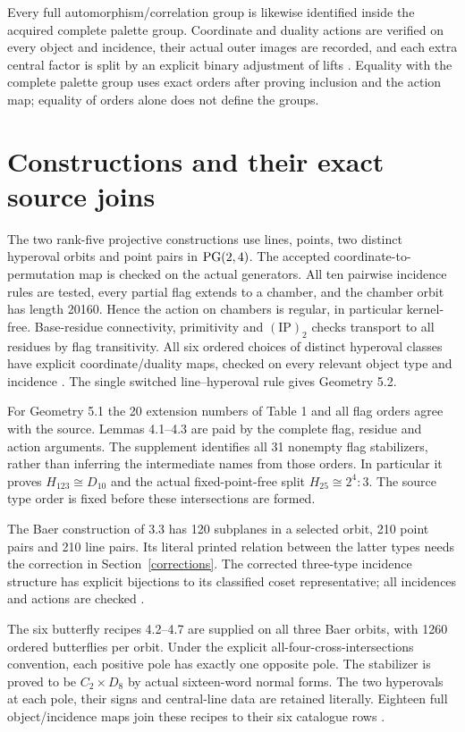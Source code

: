 \documentclass[11pt]{article}
\newcommand{\ip}{\mathrm{(IP)}_2}
\begin{document}
Every full automorphism/correlation group is likewise identified
inside the acquired complete palette group. Coordinate and duality
actions are verified on every object and incidence, their actual
outer images are recorded, and each extra central factor is split
by an explicit binary adjustment of lifts \cite{Groups}. Equality
with the complete palette group uses exact orders after proving
inclusion and the action map; equality of orders alone does not
define the groups.

\section{Constructions and their exact source joins}\label{construct}
The two rank-five projective constructions use lines, points, two
distinct hyperoval orbits and point pairs in $\operatorname{PG}(2,4)$. The accepted
coordinate-to-permutation map is checked on the actual generators.
All ten pairwise incidence rules are tested, every partial flag
extends to a chamber, and the chamber orbit has length 20160.
Hence the action on chambers is regular, in particular kernel-free.
Base-residue connectivity, primitivity and $\ip$ checks transport
to all residues by flag transitivity. All six ordered choices of
distinct hyperoval classes have explicit coordinate/duality maps,
checked on every relevant object type and incidence \cite{Projective}.
The single switched line--hyperoval rule gives Geometry 5.2.

For Geometry 5.1 the 20 extension numbers of Table 1 and all flag
orders agree with the source. Lemmas 4.1--4.3 are paid by the complete
flag, residue and action arguments. The supplement \cite{Flags}
identifies all 31 nonempty flag stabilizers, rather than inferring
the intermediate names from those orders. In particular it proves
$H_{123}\cong D_{10}$ and the actual fixed-point-free split
$H_{25}\cong2^4:3$. The source type order is fixed before these
intersections are formed.

The Baer construction of 3.3 has 120 subplanes in a selected orbit,
210 point pairs and 210 line pairs. Its literal printed relation
between the latter types needs the correction in Section~\ref{corrections}.
The corrected three-type incidence structure has explicit bijections
to its classified coset representative; all incidences and actions
are checked \cite{Baer}.

The six butterfly recipes 4.2--4.7 are supplied on all three Baer
orbits, with 1260 ordered butterflies per orbit. Under the explicit
all-four-cross-intersections convention, each positive pole has
exactly one opposite pole. The stabilizer is proved to be
$C_2\times D_8$ by actual sixteen-word normal forms. The two
hyperovals at each pole, their signs and central-line data are
retained literally. Eighteen full object/incidence maps join these
recipes to their six catalogue rows \cite{Butterfly}.
\end{document}

